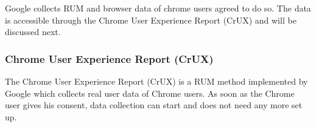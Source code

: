 
Google collects RUM and browser data of chrome users agreed to do so.
The data is accessible through the Chrome User Experience Report (CrUX) and will be discussed next.

















\subsubsection{Chrome User Experience Report (CrUX)}


The Chrome User Experience Report (CrUX) is a RUM method implemented by Google which collects real user data of Chrome users.
As soon as the Chrome user gives his consent, data collection can start and does not need any more set up.

